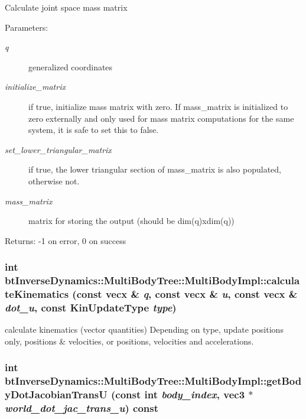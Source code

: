 Calculate joint space mass matrix \begin{Desc}
\item[Parameters:]
\begin{description}
\item[{\em q}]generalized coordinates \item[{\em initialize\_\-matrix}]if true, initialize mass matrix with zero. If mass\_\-matrix is initialized to zero externally and only used for mass matrix computations for the same system, it is safe to set this to false. \item[{\em set\_\-lower\_\-triangular\_\-matrix}]if true, the lower triangular section of mass\_\-matrix is also populated, otherwise not. \item[{\em mass\_\-matrix}]matrix for storing the output (should be dim(q)xdim(q)) \end{description}
\end{Desc}
\begin{Desc}
\item[Returns:]-1 on error, 0 on success \end{Desc}
 \hypertarget{classbt_inverse_dynamics_1_1_multi_body_tree_1_1_multi_body_impl_32cb26dc4a94027f8206182f5a528bea}{
\subsubsection[calculateKinematics]{\setlength{\rightskip}{0pt plus 5cm}int btInverseDynamics::MultiBodyTree::MultiBodyImpl::calculateKinematics (const vecx \& {\em q}, \/  const vecx \& {\em u}, \/  const vecx \& {\em dot\_\-u}, \/  const KinUpdateType {\em type})}}
\label{classbt_inverse_dynamics_1_1_multi_body_tree_1_1_multi_body_impl_32cb26dc4a94027f8206182f5a528bea}


calculate kinematics (vector quantities) Depending on type, update positions only, positions \& velocities, or positions, velocities and accelerations. \hypertarget{classbt_inverse_dynamics_1_1_multi_body_tree_1_1_multi_body_impl_3121da37900effff77e309b2c5a2cd16}{
\subsubsection[getBodyDotJacobianTransU]{\setlength{\rightskip}{0pt plus 5cm}int btInverseDynamics::MultiBodyTree::MultiBodyImpl::getBodyDotJacobianTransU (const int {\em body\_\-index}, \/  {\bf vec3} $\ast$ {\em world\_\-dot\_\-jac\_\-trans\_\-u}) const}}
\label{classbt_inverse_dynamics_1_1_multi_body_tree_1_1_multi_body_impl_3121da37900effff77e309b2c5a2cd16}


